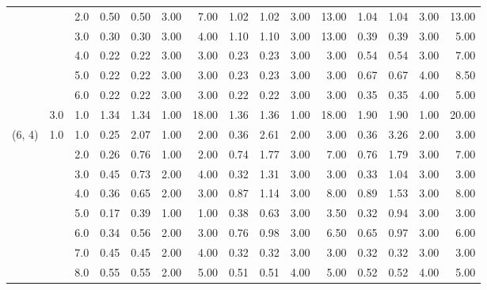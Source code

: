 \begin{tabular}{lllrrrrrrrrrrrr}
       &     & 2.0  &       0.50 &      0.50 & 3.00 &   7.00 &       1.02 &      1.02 &  3.00 &  13.00 &       1.04 &      1.04 &  3.00 &  13.00 \\
       &     & 3.0  &       0.30 &      0.30 & 3.00 &   4.00 &       1.10 &      1.10 &  3.00 &  13.00 &       0.39 &      0.39 &  3.00 &   5.00 \\
       &     & 4.0  &       0.22 &      0.22 & 3.00 &   3.00 &       0.23 &      0.23 &  3.00 &   3.00 &       0.54 &      0.54 &  3.00 &   7.00 \\
       &     & 5.0  &       0.22 &      0.22 & 3.00 &   3.00 &       0.23 &      0.23 &  3.00 &   3.00 &       0.67 &      0.67 &  4.00 &   8.50 \\
       &     & 6.0  &       0.22 &      0.22 & 3.00 &   3.00 &       0.22 &      0.22 &  3.00 &   3.00 &       0.35 &      0.35 &  4.00 &   5.00 \\
       & 3.0 & 1.0  &       1.34 &      1.34 & 1.00 &  18.00 &       1.36 &      1.36 &  1.00 &  18.00 &       1.90 &      1.90 &  1.00 &  20.00 \\
(6, 4) & 1.0 & 1.0  &       0.25 &      2.07 & 1.00 &   2.00 &       0.36 &      2.61 &  2.00 &   3.00 &       0.36 &      3.26 &  2.00 &   3.00 \\
       &     & 2.0  &       0.26 &      0.76 & 1.00 &   2.00 &       0.74 &      1.77 &  3.00 &   7.00 &       0.76 &      1.79 &  3.00 &   7.00 \\
       &     & 3.0  &       0.45 &      0.73 & 2.00 &   4.00 &       0.32 &      1.31 &  3.00 &   3.00 &       0.33 &      1.04 &  3.00 &   3.00 \\
       &     & 4.0  &       0.36 &      0.65 & 2.00 &   3.00 &       0.87 &      1.14 &  3.00 &   8.00 &       0.89 &      1.53 &  3.00 &   8.00 \\
       &     & 5.0  &       0.17 &      0.39 & 1.00 &   1.00 &       0.38 &      0.63 &  3.00 &   3.50 &       0.32 &      0.94 &  3.00 &   3.00 \\
       &     & 6.0  &       0.34 &      0.56 & 2.00 &   3.00 &       0.76 &      0.98 &  3.00 &   6.50 &       0.65 &      0.97 &  3.00 &   6.00 \\
       &     & 7.0  &       0.45 &      0.45 & 2.00 &   4.00 &       0.32 &      0.32 &  3.00 &   3.00 &       0.32 &      0.32 &  3.00 &   3.00 \\
       &     & 8.0  &       0.55 &      0.55 & 2.00 &   5.00 &       0.51 &      0.51 &  4.00 &   5.00 &       0.52 &      0.52 &  4.00 &   5.00 \\

\end{tabular}
